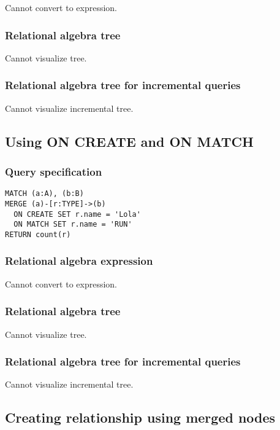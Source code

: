 Cannot convert to expression.

\subsubsection*{Relational algebra tree}

Cannot visualize tree.

\subsubsection*{Relational algebra tree for incremental queries}

Cannot visualize incremental tree.

\subsection{Using ON CREATE and ON MATCH}

\subsubsection*{Query specification}

\begin{lstlisting}
MATCH (a:A), (b:B)
MERGE (a)-[r:TYPE]->(b)
  ON CREATE SET r.name = 'Lola'
  ON MATCH SET r.name = 'RUN'
RETURN count(r)
\end{lstlisting}

\subsubsection*{Relational algebra expression}

Cannot convert to expression.

\subsubsection*{Relational algebra tree}

Cannot visualize tree.

\subsubsection*{Relational algebra tree for incremental queries}

Cannot visualize incremental tree.

\subsection{Creating relationship using merged nodes}

